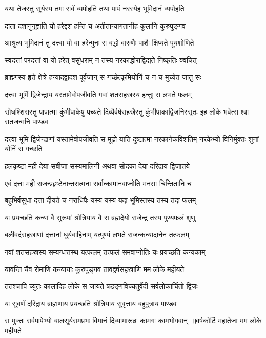 \twolineshloka
{यथा तेजस्तु सूर्यस्य तमः सर्वं व्यपोहति}
{तथा पापं नरस्येह भूमिदानं व्यपोहति}


\twolineshloka
{दाता दशानुगृह्णाति यो हरेद्दश हन्ति च}
{अतीतान्यागतानीह कुलानि कुरुपुङ्गव}


\twolineshloka
{आश्रुत्य भूमिदानं तु दत्त्वा यो वा हरेन्पुनः}
{स बद्धो वारुणैः पाशैः क्षिप्यते पूयशोणिते}


\twolineshloka
{स्वदत्तां परदत्तां वा यो हरेत् वसुंधराम्}
{न तस्य नरकाद्धोराद्विद्यते निष्कृतिः क्वचित्}


\twolineshloka
{ब्राह्म्णस्य हृते क्षेत्रे हन्याद्द्वादश पूर्वजान्}
{स गच्छेत्कृमियोनिं च न च मुच्येत जातु सः}


\twolineshloka
{दत्त्वा भूमिं द्विजेन्द्राय यस्तामेवोपजीवति}
{गवां शतसहस्रस्य हन्तुः स लभते फलम्}


\threelineshloka
{सोधश्शिरास्तु पापात्मा कुंभीपाकेषु पच्यते}
{दिव्यैर्वर्षसहस्रैस्तु कुंभीपाकाद्विजनिस्सृतः}
{इह लोके भवेत्स श्वा रातजन्मनि पाण्डव}


\threelineshloka
{दत्त्वा भूमि द्विजेन्द्राणां यस्तामेवोपजीवति}
{स मूढो याति दुष्टात्मा नरकानेकविंशतिम्}
{नरकेभ्यो विनिर्मुक्तः शुनां योनिं स गच्छति}


\twolineshloka
{हलकृष्टा मही देया सबीजा सस्यमालिनी}
{अथवा सोदका देया दरिद्राय द्विजातये}


\twolineshloka
{एवं दत्ता मही राजन्प्रहृष्टेनान्तरात्मना}
{सर्वान्कामानवाप्नोति मनसा चिन्तितानि च}


\twolineshloka
{बहुभिर्वसुधा दत्ता दीयते च नराधिपैः}
{यस्य यस्य यदा भूमिस्तस्य तस्य तदा फलम्}


\twolineshloka
{यः प्रयच्छति कन्यां वै सुरूपां श्रोत्रियाय वै}
{स ब्रह्मदेयो राजेन्द्र तस्य पुण्यफलं शृणु}


\twolineshloka
{बलीवर्दसहस्राणां दत्तानां धुर्यवाहिनाम्}
{यत्पुण्यं लभते राजन्कन्यादानेन तत्फलम्}


\twolineshloka
{गवां शतसहस्रस्य सम्यग्धत्तस्थ यत्फलम्}
{तत्फलं समवाप्नोतिः यः प्रयच्छति कन्यकाम्}


\twolineshloka
{यावन्ति चैव रोमाणि कन्यायाः कुरुपुङ्गव}
{तावद्वर्षसहस्राणि मम लोके महीयते}


\twolineshloka
{ततश्चापि च्युतः कालादिह लोके स जायते}
{षडङ्गविच्चतुर्वेदी सर्वलोकार्चितो द्विजः}


\twolineshloka
{यः सुवर्णं दरिद्राय ब्राह्मणाय प्रयच्छति}
{श्रोत्रियाय सुवृत्ताय बहुपुत्राय पाण्डव}


\twolineshloka
{स मुक्तः सर्वपापेभ्यो बालसूर्यसमप्रभः}
{विमानं दिव्यामारूढः कामगः कामभोगवान् ॥वर्षकोटिं महातेजा मम लोके महीयते}



